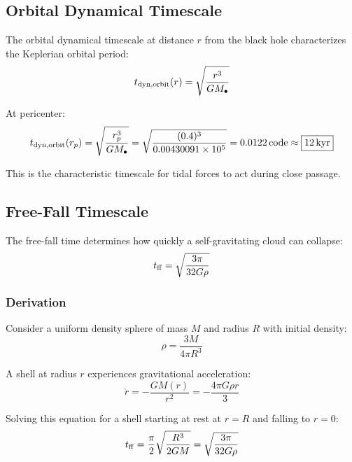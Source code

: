 \documentclass[twocolumn,amsmath,amssymb,prd,superscriptaddress,nofootinbib]{revtex4-2}
\begin{document}
\subsection{Orbital Dynamical Timescale}
\label{sec:t_orbit}

The orbital dynamical timescale at distance $r$ from the black hole characterizes the Keplerian orbital period:
\begin{equation}
    t_{\rm dyn,orbit}(r) = \sqrt{\frac{r^3}{GM_\bullet}}
    \label{eq:t_dyn_orbit}
\end{equation}

At pericenter:
\begin{equation}
    t_{\rm dyn,orbit}(r_p) = \sqrt{\frac{r_p^3}{GM_\bullet}} = \sqrt{\frac{(0.4)^3}{0.00430091 \times 10^5}} = 0.0122\,{\rm code} \approx \boxed{12\,{\rm kyr}}
\end{equation}

This is the characteristic timescale for tidal forces to act during close passage.

\subsection{Free-Fall Timescale}
\label{sec:t_ff}

The free-fall time determines how quickly a self-gravitating cloud can collapse:
\begin{equation}
    t_{\rm ff} = \sqrt{\frac{3\pi}{32 G \rho}}
    \label{eq:t_ff}
\end{equation}

\subsubsection{Derivation}

Consider a uniform density sphere of mass $M$ and radius $R$ with initial density:
\begin{equation}
    \rho = \frac{3M}{4\pi R^3}
\end{equation}

A shell at radius $r$ experiences gravitational acceleration:
\begin{equation}
    \ddot{r} = -\frac{GM(r)}{r^2} = -\frac{4\pi G \rho r}{3}
\end{equation}

Solving this equation for a shell starting at rest at $r = R$ and falling to $r = 0$:
\begin{equation}
    t_{\rm ff} = \frac{\pi}{2}\sqrt{\frac{R^3}{2GM}} = \sqrt{\frac{3\pi}{32 G \rho}}
\end{equation}
\end{document}

